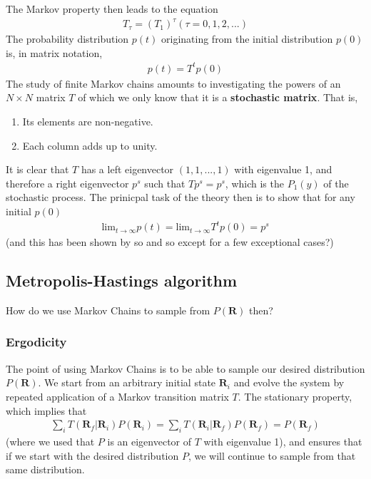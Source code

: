 \documentclass[twoside,english]{uiofysmaster}
\begin{document}
The Markov property then leads to the equation
\begin{align}
	T_\tau = (T_1)^{\tau} (\tau = 0,1,2,...)
\end{align}
The probability distribution $p(t)$ originating from the initial distribution $p(0)$ is, in matrix notation,
\begin{align}
	p(t) = T^t p(0)
\end{align}
The study of finite Markov chains amounts to investigating the powers of an $N\times N$ matrix $T$ of which we only know that it is a \textbf{stochastic matrix}. That is,
\begin{enumerate}
	\item Its elements are non-negative.
	\item Each column adds up to unity.
\end{enumerate}
It is clear that $T$ has a left eigenvector $(1,1,...,1)$ with eigenvalue 1, and therefore a right eigenvector $p^s$ such that $T p^s = p^s$, which is the $P_1(y)$ of the stochastic process.
The prinicpal task of the theory then is to show that for any initial $p(0)$
\begin{align}
	\text{lim}_{t\rightarrow \infty} p(t) = \text{lim}_{t\rightarrow \infty} T^t p(0) = p^s
\end{align}
(and this has been shown by so and so except for a few exceptional cases?)
\cite{VanKampen2007}



\subsection{Metropolis-Hastings algorithm}
How do we use Markov Chains to sample from $P(\bm{R})$ then?

\subsubsection{Ergodicity}
The point of using Markov Chains is to be able to sample our desired distribution $P(\bm{R})$. We start from an arbitrary initial state $\bm{R}_i$ and evolve the system by repeated application of a Markov transition matrix $T$. The stationary property, which implies that
\begin{align}
	\sum_i T(\bm{R}_f | \bm{R}_i) P (\bm{R}_i) = \sum_i T (\bm{R}_i | \bm{R}_f) P (\bm{R}_f) = P(\bm{R}_f)
\end{align}
(where we used that $P$ is an eigenvector of $T$ with eigenvalue 1), and ensures that if we start with the desired distribution $P$, we will continue to sample from that same distribution.
\end{document}
